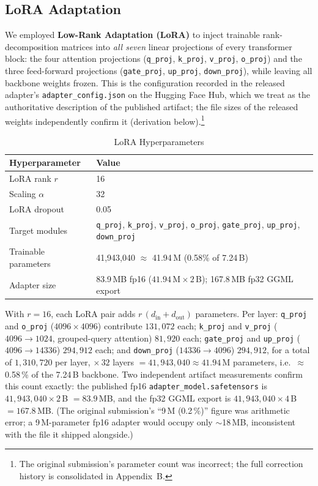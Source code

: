 \documentclass[a4paper]{article}
\begin{document}
\subsection{LoRA Adaptation}

We employed \textbf{Low-Rank Adaptation (LoRA)} \cite{hu2022} to inject trainable rank-decomposition matrices into \emph{all seven} linear projections of every transformer block: the four attention projections (\texttt{q\_proj}, \texttt{k\_proj}, \texttt{v\_proj}, \texttt{o\_proj}) and the three feed-forward projections (\texttt{gate\_proj}, \texttt{up\_proj}, \texttt{down\_proj}), while leaving all backbone weights frozen. This is the configuration recorded in the released adapter's \texttt{adapter\_config.json} on the Hugging Face Hub, which we treat as the authoritative description of the published artifact; the file sizes of the released weights independently confirm it (derivation below).\footnote{The original submission's parameter count was incorrect; the full correction history is consolidated in Appendix~B.}

\begin{table}[htbp]
\centering
\caption{LoRA Hyperparameters}
\label{tab:lora-hyper}
\begin{tabular}{ll}
\toprule
\textbf{Hyperparameter} & \textbf{Value} \\
\midrule
LoRA rank $r$        & 16 \\
Scaling $\alpha$     & 32 \\
LoRA dropout         & 0.05 \\
Target modules       & \texttt{q\_proj}, \texttt{k\_proj}, \texttt{v\_proj}, \texttt{o\_proj}, \texttt{gate\_proj}, \texttt{up\_proj}, \texttt{down\_proj} \\
Trainable parameters & 41{,}943{,}040 $\approx$ 41.94\,M (0.58\% of 7.24\,B) \\
Adapter size         & 83.9\,MB fp16 ($41.94\,\mathrm{M}\times2$\,B); 167.8\,MB fp32 GGML export \\
\bottomrule
\end{tabular}
\end{table}

With $r=16$, each LoRA pair adds $r\,(d_{\mathrm{in}}{+}d_{\mathrm{out}})$ parameters. Per layer: \texttt{q\_proj} and \texttt{o\_proj} ($4096{\times}4096$) contribute $131{,}072$ each; \texttt{k\_proj} and \texttt{v\_proj} ($4096{\to}1024$, grouped-query attention) $81{,}920$ each; \texttt{gate\_proj} and \texttt{up\_proj} ($4096{\to}14336$) $294{,}912$ each; and \texttt{down\_proj} ($14336{\to}4096$) $294{,}912$, for a total of $1{,}310{,}720$ per layer, $\times\,32$ layers $= 41{,}943{,}040 \approx 41.94$\,M parameters, i.e.\ $\approx$\,0.58\,\% of the 7.24\,B backbone. Two independent artifact measurements confirm this count exactly: the published fp16 \texttt{adapter\_model.safetensors} is $41{,}943{,}040 \times 2$\,B $= 83.9$\,MB, and the fp32 GGML export is $41{,}943{,}040 \times 4$\,B $= 167.8$\,MB. (The original submission's ``9\,M (0.2\,\%)'' figure was arithmetic error; a 9\,M-parameter fp16 adapter would occupy only ${\sim}$18\,MB, inconsistent with the file it shipped alongside.)
\end{document}

